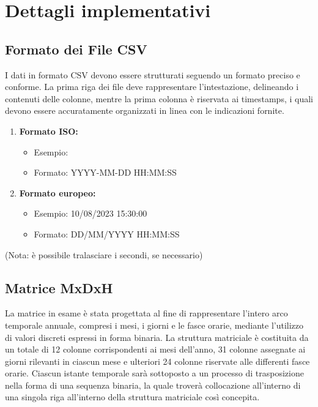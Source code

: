 \documentclass{rapportECL}
\begin{document}
\chapter{Dettagli implementativi}
\label{cha:scelte}

\section{Formato dei File CSV}

I dati in formato CSV devono essere strutturati seguendo un formato preciso e conforme. 
La prima riga dei file deve rappresentare l'intestazione, delineando i contenuti delle colonne, mentre la prima colonna è riservata ai timestamps, 
i quali devono essere accuratamente organizzati in linea con le indicazioni fornite.
\begin{enumerate} 
  \item \textbf{Formato ISO:}
  \begin{itemize}
    \item Esempio:  
    \item Formato: YYYY-MM-DD HH:MM:SS
  \end{itemize}
  \item \textbf{Formato europeo:}
  \begin{itemize}
    \item Esempio: 10/08/2023 15:30:00
    \item Formato: DD/MM/YYYY HH:MM:SS
  \end{itemize} 
\end{enumerate}

(Nota: è possibile tralasciare i secondi, se necessario)

\section{Matrice MxDxH}

La matrice in esame è stata progettata al fine di rappresentare l'intero arco temporale annuale, compresi i mesi, i giorni e le fasce orarie, 
mediante l'utilizzo di valori discreti espressi in forma binaria. 
La struttura matriciale è costituita da un totale di 12 colonne corrispondenti ai mesi dell'anno, 31 colonne assegnate 
ai giorni rilevanti in ciascun mese e ulteriori 24 colonne riservate alle differenti fasce orarie. 
Ciascun istante temporale sarà sottoposto a un processo di trasposizione nella forma di una sequenza binaria, 
la quale troverà collocazione all'interno di una singola riga all'interno della struttura matriciale così concepita.
 
\end{document}
